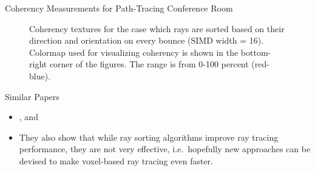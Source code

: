 \documentclass{beamer}
\begin{document}
\begin{frame}{Coherency Measurements for Path-Tracing Conference Room}
	\begin{figure}
		\centering
		\caption{Coherency textures for the case which rays are sorted based on their direction and orientation on every bounce (SIMD width = 16). Colormap used for visualizing coherency is shown in the bottom-right corner of the figures. The range is from 0-100 percent (red-blue).}
	\end{figure}
\end{frame}

\begin{frame}{Similar Papers}
	\begin{itemize}
		\item \cite{Barringer:2014:DRS:2601097.2601222}, and \cite{pgs.20141257}
		\item They also show that while ray sorting algorithms improve ray tracing performance, they are not very effective, i.e.~hopefully new approaches can be devised to make voxel-based ray tracing even faster.
	\end{itemize}
\end{frame}
\end{document}

